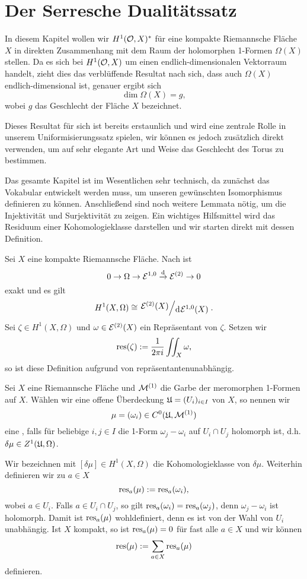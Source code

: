 \section{Der Serresche Dualitätssatz}
\label{sec:serre}

In diesem Kapitel wollen wir $H^1(\mathcal{O}, X)^\ast$ für eine kompakte
Riemannsche Fläche $X$ in direkten Zusammenhang mit dem Raum der
holomorphen 1-Formen $\Omega(X)$ stellen. Da es sich bei $H^1(\mathcal{O},
X)$ um einen endlich-dimensionalen Vektorraum handelt, zieht dies das
verblüffende Resultat nach sich, dass auch $\Omega(X)$
endlich-dimensional ist, genauer ergibt sich
\[
\dim \Omega(X) = g,
\]
wobei $g$ das Geschlecht der Fläche $X$ bezeichnet.

Dieses Resultat für sich ist bereits erstaunlich und wird eine
zentrale Rolle in unserem Uniformisierungssatz spielen, wir können es
jedoch zusätzlich direkt verwenden, um auf sehr elegante Art und Weise das
Geschlecht des Torus zu bestimmen.

Das gesamte Kapitel ist im Wesentlichen sehr technisch, da zunächst
das Vokabular entwickelt werden muss, um unseren gewünschten
Isomorphismus definieren zu können. Anschließend sind noch weitere
Lemmata nötig, um die Injektivität und Surjektivität zu
zeigen. Ein wichtiges Hilfsmittel wird das Residuum einer
Kohomologieklasse darstellen und wir starten direkt mit dessen Definition.

\begin{defin}
  \label{def:res}
  Sei $X$ eine kompakte Riemannsche Fläche. Nach \cite[Satz 15.14]{For} ist
  \[
  0 \ra \Omega \ra \diff^{1,0} \xrightarrow{\d} \diff^{(2)} \ra 0
  \]
  exakt und es gilt
  \[
  H^1(X, \Omega) \cong \quot{\diff^{(2)}(X)}{\d[\diff^{1,0}(X)]}.
  \]
  Sei $\zeta \in H^1(X,
  \Omega)$ und $\omega \in \mathcal{E}^{(2)}(X)$ ein Repräsentant von
  $\zeta$. Setzen wir
  \[
  \operatorname{res}(\zeta) := \frac{1}{2\pi i} \iint_X \omega,
  \]
  so ist diese Definition aufgrund von \cite[Satz 10.20]{For} repräsentantenunabhängig.
\end{defin}

\begin{defin}
  \label{def:mlv}
  Sei $X$ eine Riemannsche Fläche und $\mathcal{M}^{(1)}$ die Garbe der
  meromorphen 1-Formen auf $X$. Wählen wir eine offene Überdeckung
  $\mathfrak{U} = (U_i)_{i \in I}$ von $X$, so nennen wir
  \[
  \mu = (\omega_i) \in C^0( \mathfrak{U}, \mathcal{M}^{(1)})
  \]
  eine , falls für beliebige $i,j \in
  I$ die 1-Form $\omega_j - \omega_i$ auf $U_i \cap U_j$ holomorph
  ist, d.h. $ \delta \mu \in Z^1(\mathfrak{U}, \Omega)$.

  Wir bezeichnen mit $[\delta \mu] \in H^1(X, \Omega)$ die
  Kohomologieklasse von $\delta \mu$. Weiterhin definieren wir zu $a \in X$
  \[
  \operatorname{res}_a(\mu) := \operatorname{res}_a(\omega_i),
  \]
  wobei $a \in U_i$. Falls $a \in U_i \cap U_j$, so gilt
  $\operatorname{res}_a(\omega_i) = \operatorname{res}_a(\omega_j)$, denn $\omega_j - \omega_i$
  ist holomorph. Damit ist $\operatorname{res}_a(\mu)$ wohldefiniert, denn es ist
  von der Wahl von $U_i$ unabhängig. Ist $X$ kompakt, so ist $\operatorname{res}_a(\mu) = 0$ für fast
  alle $a \in X$ und wir können
  \[
  \operatorname{res}(\mu) := \sum_{a \in X} \operatorname{res}_a(\mu)
  \]
  definieren.
\end{defin}

